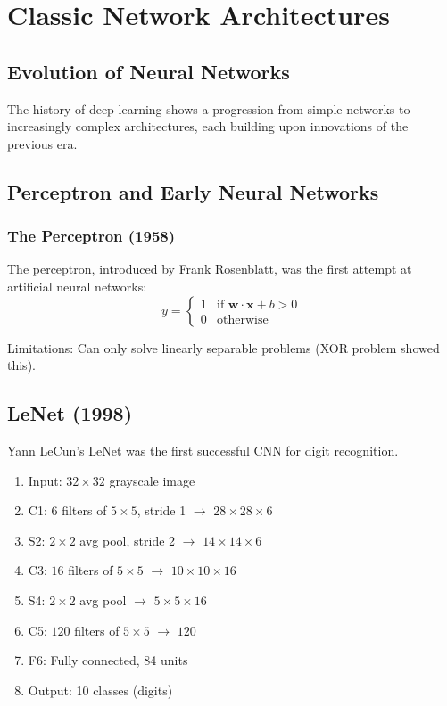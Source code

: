 %

\clearpage
\cleardoublepage

\chapter{Classic Network Architectures}

\section{Evolution of Neural Networks}

The history of deep learning shows a progression from simple networks to increasingly complex architectures, each building upon innovations of the previous era.

\section{Perceptron and Early Neural Networks}

\subsection{The Perceptron (1958)}

The perceptron, introduced by Frank Rosenblatt, was the first attempt at artificial neural networks:
\begin{equation}
y = \begin{cases} 1 & \text{if } \mathbf{w} \cdot \mathbf{x} + b > 0 \\ 0 & \text{otherwise} \end{cases}
\end{equation}

Limitations: Can only solve linearly separable problems (XOR problem showed this).

\section{LeNet (1998)}

Yann LeCun's LeNet was the first successful CNN for digit recognition.

\begin{architecture}
\begin{enumerate}
    \item Input: $32\times32$ grayscale image
    \item C1: $6$ filters of $5\times5$, stride 1 $\rightarrow$ $28\times28\times6$
    \item S2: $2\times2$ avg pool, stride 2 $\rightarrow$ $14\times14\times6$
    \item C3: $16$ filters of $5\times5$ $\rightarrow$ $10\times10\times16$
    \item S4: $2\times2$ avg pool $\rightarrow$ $5\times5\times16$
    \item C5: $120$ filters of $5\times5$ $\rightarrow$ $120$
    \item F6: Fully connected, 84 units
    \item Output: 10 classes (digits)
\end{enumerate}
\end{architecture}

